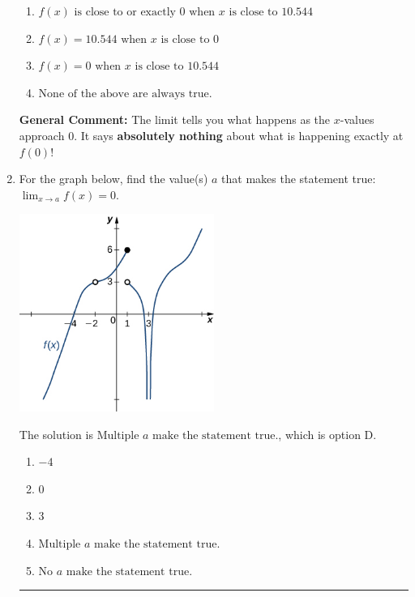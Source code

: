 \documentclass{extbook}[14pt]
\newcommand{\litem}[1]{\item #1

\rule{\textwidth}{0.4pt}}
\begin{document}
\begin{enumerate}
{\begin{enumerate}[label=\Alph*.]
\item \( f(x) \text{ is close to or exactly } 0 \text{ when } x \text{ is close to } 10.544 \)


\item \( f(x) = 10.544 \text{ when } x \text{ is close to } 0 \)


\item \( f(x) = 0 \text{ when } x \text{ is close to } 10.544 \)


\item \( \text{None of the above are always true.} \)


\end{enumerate}

\textbf{General Comment:} The limit tells you what happens as the $x$-values approach $0$. It says \textbf{absolutely nothing} about what is happening exactly at $f(0)$!
}
\litem{
For the graph below, find the value(s) $a$ that makes the statement true: $ \displaystyle \lim_{x \rightarrow a} f(x) = 0$.

\begin{center}
    \includegraphics[width=0.5\textwidth]{../Figures/evaluateLimitGraphicallyCopyC.png}
\end{center}


The solution is \( \text{Multiple } a \text{ make the statement true}. \), which is option D.\begin{enumerate}[label=\Alph*.]
\item \( -4 \)


\item \( 0 \)


\item \( 3 \)


\item \( \text{Multiple } a \text{ make the statement true}. \)


\item \( \text{No } a \text{ make the statement true}. \)



\end{enumerate}}
\end{enumerate}
\end{document}

